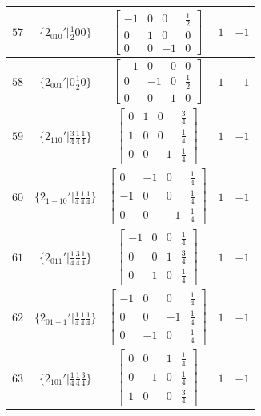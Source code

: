 \documentclass[fleqn,8pt]{jsarticle}
\begin{document}
\begin{longtable}{ccccc}
$ 57 $ & $ \{2{}_{010}{}'|\frac{1}{2} 0 0\} $ & $ \begin{bmatrix} -1 & 0 & 0 & \frac{1}{2} \\ 0 & 1 & 0 & 0 \\ 0 & 0 & -1 & 0 \end{bmatrix} $ & $ 1 $ & $ -1 $ \\ \hline
$ 58 $ & $ \{2{}_{001}{}'|0 \frac{1}{2} 0\} $ & $ \begin{bmatrix} -1 & 0 & 0 & 0 \\ 0 & -1 & 0 & \frac{1}{2} \\ 0 & 0 & 1 & 0 \end{bmatrix} $ & $ 1 $ & $ -1 $ \\ \hline
$ 59 $ & $ \{2{}_{110}{}'|\frac{3}{4} \frac{1}{4} \frac{1}{4}\} $ & $ \begin{bmatrix} 0 & 1 & 0 & \frac{3}{4} \\ 1 & 0 & 0 & \frac{1}{4} \\ 0 & 0 & -1 & \frac{1}{4} \end{bmatrix} $ & $ 1 $ & $ -1 $ \\ \hline
$ 60 $ & $ \{2{}_{1-10}{}'|\frac{1}{4} \frac{1}{4} \frac{1}{4}\} $ & $ \begin{bmatrix} 0 & -1 & 0 & \frac{1}{4} \\ -1 & 0 & 0 & \frac{1}{4} \\ 0 & 0 & -1 & \frac{1}{4} \end{bmatrix} $ & $ 1 $ & $ -1 $ \\ \hline
$ 61 $ & $ \{2{}_{011}{}'|\frac{1}{4} \frac{3}{4} \frac{1}{4}\} $ & $ \begin{bmatrix} -1 & 0 & 0 & \frac{1}{4} \\ 0 & 0 & 1 & \frac{3}{4} \\ 0 & 1 & 0 & \frac{1}{4} \end{bmatrix} $ & $ 1 $ & $ -1 $ \\ \hline
$ 62 $ & $ \{2{}_{01-1}{}'|\frac{1}{4} \frac{1}{4} \frac{1}{4}\} $ & $ \begin{bmatrix} -1 & 0 & 0 & \frac{1}{4} \\ 0 & 0 & -1 & \frac{1}{4} \\ 0 & -1 & 0 & \frac{1}{4} \end{bmatrix} $ & $ 1 $ & $ -1 $ \\ \hline
$ 63 $ & $ \{2{}_{101}{}'|\frac{1}{4} \frac{1}{4} \frac{3}{4}\} $ & $ \begin{bmatrix} 0 & 0 & 1 & \frac{1}{4} \\ 0 & -1 & 0 & \frac{1}{4} \\ 1 & 0 & 0 & \frac{3}{4} \end{bmatrix} $ & $ 1 $ & $ -1 $ \\ \hline

\end{longtable}
\end{document}

